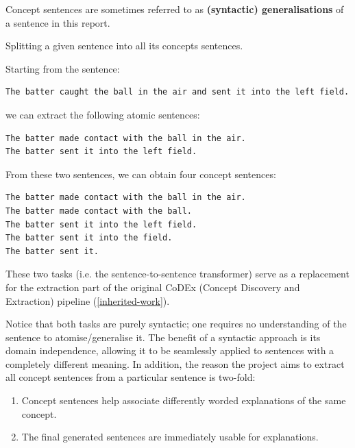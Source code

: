 Concept sentences are sometimes referred to as \textbf{(syntactic) generalisations} of a sentence in this report.


\begin{example}
Splitting a given sentence into all its concepts sentences.

Starting from the sentence:  
\begin{verbatim}
The batter caught the ball in the air and sent it into the left field.
\end{verbatim}
we can extract the following atomic sentences: 
\begin{verbatim}
The batter made contact with the ball in the air. 
The batter sent it into the left field.
\end{verbatim}
From these two sentences, we can obtain four concept sentences: 
\begin{verbatim}
The batter made contact with the ball in the air.
The batter made contact with the ball.
The batter sent it into the left field.
The batter sent it into the field.
The batter sent it.
\end{verbatim}

\end{example}

These two tasks (i.e. the sentence-to-sentence transformer) serve as a replacement for the extraction part of the original CoDEx (Concept Discovery and Extraction) pipeline (\ref{inherited-work}).

Notice that both tasks are purely syntactic; one requires no understanding of the sentence to atomise/generalise it.
The benefit of a syntactic approach is its domain independence, allowing it to be seamlessly applied to sentences with a completely different meaning.
In addition, the reason the project aims to extract all concept sentences from a particular sentence is two-fold:
\begin{enumerate}
    \item Concept sentences help associate differently worded explanations of the same concept.
    \item The final generated sentences are immediately usable for explanations.
\end{enumerate}


